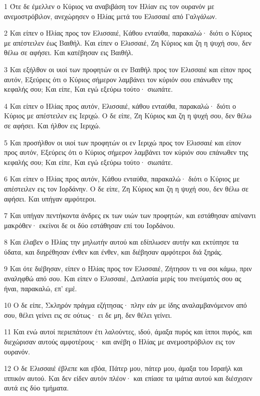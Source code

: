 \par 1 Ότε δε έμελλεν ο Κύριος να αναβιβάση τον Ηλίαν εις τον ουρανόν με ανεμοστρόβιλον, ανεχώρησεν ο Ηλίας μετά του Ελισσαιέ από Γαλγάλων.
\par 2 Και είπεν ο Ηλίας προς τον Ελισσαιέ, Κάθου ενταύθα, παρακαλώ· διότι ο Κύριος με απέστειλεν έως Βαιθήλ. Και είπεν ο Ελισσαιέ, Ζη Κύριος και ζη η ψυχή σου, δεν θέλω σε αφήσει. Και κατέβησαν εις Βαιθήλ.
\par 3 Και εξήλθον οι υιοί των προφητών οι εν Βαιθήλ προς τον Ελισσαιέ και είπον προς αυτόν, Εξεύρεις ότι ο Κύριος σήμερον λαμβάνει τον κύριόν σου επάνωθεν της κεφαλής σου; Και είπε, Και εγώ εξεύρω τούτο· σιωπάτε.
\par 4 Και είπεν ο Ηλίας προς αυτόν, Ελισσαιέ, κάθου ενταύθα, παρακαλώ· διότι ο Κύριος με απέστειλεν εις Ιεριχώ. Ο δε είπε, Ζη Κύριος και ζη η ψυχή σου, δεν θέλω σε αφήσει. Και ήλθον εις Ιεριχώ.
\par 5 Και προσήλθον οι υιοί των προφητών οι εν Ιεριχώ προς τον Ελισσαιέ και είπον προς αυτόν, Εξεύρεις ότι ο Κύριος σήμερον λαμβάνει τον κύριόν σου επάνωθεν της κεφαλής σου; Και είπε, Και εγώ εξεύρω τούτο· σιωπάτε.
\par 6 Και είπεν ο Ηλίας προς αυτόν, Κάθου ενταύθα, παρακαλώ· διότι ο Κύριος με απέστειλεν εις τον Ιορδάνην. Ο δε είπε, Ζη Κύριος και ζη η ψυχή σου, δεν θέλω σε αφήσει. Και υπήγαν αμφότεροι.
\par 7 Και υπήγαν πεντήκοντα άνδρες εκ των υιών των προφητών, και εστάθησαν απέναντι μακρόθεν· εκείνοι δε οι δύο εστάθησαν επί του Ιορδάνου.
\par 8 Και έλαβεν ο Ηλίας την μηλωτήν αυτού και εδίπλωσεν αυτήν και εκτύπησε τα ύδατα, και διηρέθησαν ένθεν και ένθεν, και διέβησαν αμφότεροι διά ξηράς.
\par 9 Και ότε διέβησαν, είπεν ο Ηλίας προς τον Ελισσαιέ, Ζήτησον τι να σοι κάμω, πριν αναληφθώ από σου. Και είπεν ο Ελισσαιέ, Διπλασία μερίς του πνεύματός σου ας ήναι, παρακαλώ, επ' εμέ.
\par 10 Ο δε είπε, Σκληρόν πράγμα εζήτησας· πλην εάν με ίδης αναλαμβανόμενον από σου, θέλει γείνει εις σε ούτως· ει δε μη, δεν θέλει γείνει.
\par 11 Και ενώ αυτοί περιεπάτουν έτι λαλούντες, ιδού, άμαξα πυρός και ίπποι πυρός, και διεχώρισαν αυτούς αμφοτέρους· και ανέβη ο Ηλίας με ανεμοστρόβιλον εις τον ουρανόν.
\par 12 Ο δε Ελισσαιέ έβλεπε και εβόα, Πάτερ μου, πάτερ μου, άμαξα του Ισραήλ και ιππικόν αυτού. Και δεν είδεν αυτόν πλέον· και επίασε τα ιμάτια αυτού και διέσχισεν αυτά εις δύο τμήματα.
